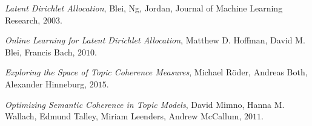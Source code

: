 \begin{thebibliography}{99}
	\textit{Latent Dirichlet Allocation}, Blei, Ng, Jordan, Journal of Machine Learning Research, $2003$.
	
	\textit{Online Learning for Latent Dirichlet Allocation}, Matthew D. Hoffman, David M. Blei, Francis Bach, $2010$.
	
	
	\textit{Exploring the Space of Topic Coherence Measures}, Michael Röder, Andreas Both, Alexander Hinneburg, $2015$.
	
	\textit{Optimizing Semantic Coherence in Topic Models}, David Mimno, Hanna M. Wallach, Edmund Talley, Miriam Leenders, Andrew McCallum, $2011$.
\end{thebibliography}